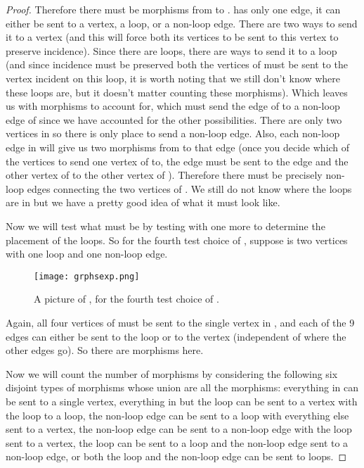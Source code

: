 \documentclass[11pt]{article}
\begin{document}
\begin{proof}
Therefore there must be  morphisms from  to .  has only one edge, it can either be sent to a vertex, a loop, or a non-loop edge. There are two ways to send it to a vertex (and this will force both its vertices to be sent to this vertex to preserve incidence). Since there are  loops, there are  ways to send it to a loop (and since incidence must be preserved both the vertices of  must be sent to the vertex incident on this loop, it is worth noting that we still don't know where these  loops are, but it doesn't matter counting these morphisms). Which leaves us with  morphisms to account for, which must send the edge of  to a non-loop edge of  since we have accounted for the other possibilities. There are only two vertices in  so there is only place to send a non-loop edge. Also, each non-loop edge in  will give us two morphisms from  to that edge (once you decide which of the vertices to send one vertex of  to, the edge must be sent to the  edge and the other vertex of  to the other vertex of ). Therefore there must be precisely  non-loop edges connecting the two vertices of . We still do not know where the  loops are in  but we have a pretty good idea of what it must look like.\par
Now we will test what  must be by testing with one more  to determine the placement of the loops. So for the fourth test choice of , suppose  is two vertices with one loop and one non-loop edge.\par
\begin{figure}[h]
\centering \texttt{[image: grphsexp.png]}
\caption{A picture of , for the fourth test choice of .}
\end{figure}\par
Again, all four vertices of  must be sent to the single vertex in , and each of the 9 edges can either be sent to the loop or to the vertex (independent of where the other edges go). So there are  morphisms here.\par
Now we will count the number of morphisms  by considering the following six disjoint types of morphisms whose union are all the morphisms: everything in  can be sent to a single vertex, everything in  but the loop can be sent to a vertex with the loop to a loop, the non-loop edge can be sent to a loop with everything else sent to a vertex, the non-loop edge can be sent to a non-loop edge with the loop sent to a vertex, the loop can be sent to a loop and the non-loop edge sent to a non-loop edge, or both the loop and the non-loop edge can be sent to loops.\par

\end{proof}
\end{document}
